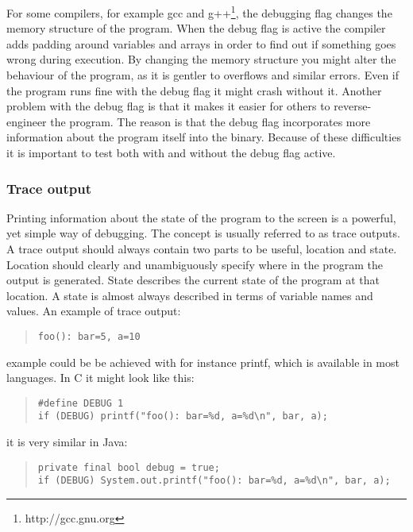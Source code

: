 \documentclass[11pt,a4paper,twoside]{article}
\begin{document}
For some compilers, for example gcc and g++\footnote{http://gcc.gnu.org}, the
debugging flag changes the memory structure of the program. When the debug flag
is active the compiler adds padding around variables and arrays in order to
find out if something goes wrong during execution. By changing the memory
structure you might alter the behaviour of the program, as it is gentler to
overflows and similar errors.  Even if the program runs fine with the debug
flag it might crash without it.  Another problem with the debug flag is that it
makes it easier for others to reverse-engineer the program. The reason is that
the debug flag incorporates more information about the program itself into the
binary. Because of these difficulties it is important to test both with and
without the debug flag active.


\subsubsection{Trace output}

Printing information about the state of the program to the screen is a
powerful, yet simple way of debugging. The concept is usually referred to as
trace outputs. A trace output should always contain two parts to be useful,
location and state. Location should clearly and unambiguously specify where in
the program the output is generated. State describes the current state of the
program at that location. A state is almost always described in terms of
variable names and values. An example of trace output:

\begin{quote}
\begin{verbatim}
foo(): bar=5, a=10
\end{verbatim}
\end{quote}

 example could be be achieved with for instance printf, which is
available in most languages. In C it might look like this:

\begin{quote}
\begin{verbatim}
#define DEBUG 1
if (DEBUG) printf("foo(): bar=%d, a=%d\n", bar, a);
\end{verbatim}
\end{quote}

 it is very similar in Java:

\begin{quote}
\begin{verbatim}
private final bool debug = true;
if (DEBUG) System.out.printf("foo(): bar=%d, a=%d\n", bar, a);
\end{verbatim}
\end{quote}
\end{document}
